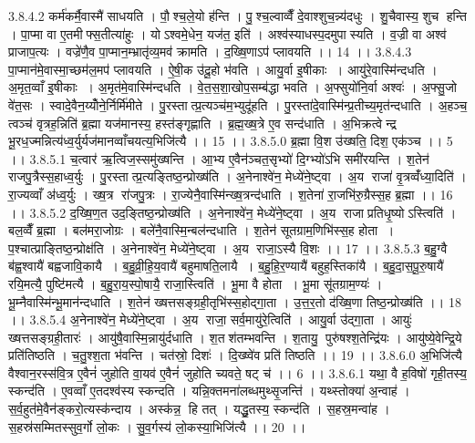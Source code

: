 3.8.4.2
कर्म॑कर्मै॒वास्मै॑ साधयति । पौ॒॒श्च॒ले॒यो ह॑न्ति । पु॒॒श्च॒ल्वाव्वैँ दे॒वाश्शुच॒न्न्य॑दधुः । शु॒चैवास्य॒ शुच॑ हन्ति । पा॒प्मा वा ए॒तमीफ्स॒तीत्या॑हुः । योऽश्वमे॒धेन॒ यज॑त॒ इति॑ । अश्व॑स्याधस्प॒दमुपास्यति । व॒ज्री वा अश्व॑ प्राजाप॒त्यः । वज्रे॑णै॒व पा॒प्मान॒म्भ्रातृ॑व्य॒मव॑ क्रामति । द॒ख्षि॒णाऽप॑ प्लावयति ।। 14 ।।
3.8.4.3
पा॒प्मान॑मे॒वास्मा॒च्छम॑ल॒मप॑ प्लावयति । ऐ॒षी॒क उ॑दू॒हो भ॑वति । आयु॒र्वा इ॒षीकाः । आयु॑रे॒वास्मि॑न्दधति । अ॒मृत॒व्वाँ इ॒षीकाः । अ॒मृत॑मे॒वास्मि॑न्दधति । वे॒त॒स॒शा॒खोप॒सम्ब॑द्धा भवति । अ॒फ्सुयो॑नि॒र्वा अश्वः॑ । अ॒फ्सु॒जो वे॑त॒सः । स्वादे॒वैन॒य्योँने॒र्निर्मि॑मीते । पु॒रस्तात्प्र॒त्यञ्च॑म॒भ्युदू॑हति । पु॒रस्ता॑दे॒वास्मि॑न्प्र॒तीच्य॒मृत॑न्दधाति । अ॒हञ्च॒ त्वञ्च॑ वृत्रह॒न्निति॑ ब्र॒ह्मा यज॑मानस्य॒ हस्त॑ङ्गृह्णाति । ब्र॒ह्म॒ख्ष॒त्रे ए॒व सन्द॑धाति । अ॒भिक्रत्वेन्द्र भू॒रध॒ज्मन्नित्य॑ध्व॒र्युर्यज॑मानव्वाँचयत्य॒भिजि॑त्यै ।। 15 ।।
3.8.5.0
ब्र॒ह्मा वि॒श उ॑ख्षति॒ दिश॒ एक॑ञ्च ।। 5 ।।
3.8.5.1
च॒त्वार॑ ऋ॒त्विज॒स्समु॑ख्षन्ति । आ॒भ्य ए॒वैन॑ञ्चत॒सृभ्यो॑ दि॒ग्भ्यो॑ऽभि समी॑रयन्ति । श॒तेन॑ राजपु॒त्रैस्स॒हाध्व॒र्युः । पु॒रस्तात्प्र॒त्यङ्तिष्ठ॒न्प्रोख्ष॑ति । अ॒नेनाश्वे॑न॒ मेध्ये॑ने॒ष्ट्वा । अ॒य राजा॑ वृ॒त्रव्वँ॑ध्या॒दिति॑ । रा॒ज्यव्वाँ अ॑ध्व॒र्युः । ख्ष॒त्र रा॑जपु॒त्रः । रा॒ज्येनै॒वास्मि॑न्ख्ष॒त्रन्द॑धाति । श॒तेना॑ रा॒जभि॑रु॒ग्रैस्स॒ह ब्र॒ह्मा ।। 16 ।।
3.8.5.2
द॒ख्षि॒ण॒त उद॒ङ्तिष्ठ॒न्प्रोख्ष॑ति । अ॒नेनाश्वे॑न॒ मेध्ये॑ने॒ष्ट्वा । अ॒य राजाप्रतिधृ॒ष्योऽस्त्विति॑ । बल॒व्वैँ ब्र॒ह्मा । बल॑मरा॒जोग्रः । बले॑नै॒वास्मि॒न्बल॑न्दधाति । श॒तेन॑ सूतग्राम॒णिभि॑स्स॒ह होता । प॒श्चात्प्राङ्तिष्ठ॒न्प्रोक्ष॑ति । अ॒नेनाश्वे॑न॒ मेध्ये॑ने॒ष्ट्वा । अ॒य राजा॒ऽस्यै वि॒शः ।। 17 ।।
3.8.5.3
ब॒हु॒ग्वै ब॑ह्व॒श्वायै॑ बह्वजावि॒कायै । ब॒हु॒व्री॒हि॒य॒वायै॑ बहुमाषति॒लायै । ब॒हु॒हि॒र॒ण्यायै॑ बहुह॒स्तिका॑यै । ब॒हु॒दा॒स॒पू॒रु॒षायै॑ रयि॒मत्यै॒ पुष्टि॑मत्यै । ब॒हु॒रा॒य॒स्पो॒षायै॒ राजा॒स्त्विति॑ । भू॒मा वै होता । भू॒मा सू॑तग्राम॒ण्यः॑ । भू॒म्नैवास्मि॑न्भू॒मान॑न्दधाति । श॒तेन॑ ख्षत्तसङ्ग्रही॒तृभि॑स्स॒होद्गा॒ता । उ॒त्त॒र॒तो द॑ख्षि॒णा तिष्ठ॒न्प्रोख्ष॑ति ।। 18 ।।
3.8.5.4
अ॒नेनाश्वे॑न॒ मेध्ये॑ने॒ष्ट्वा । अ॒य राजा॒ सर्व॒मायु॑रे॒त्विति॑ । आयु॒र्वा उ॑द्गा॒ता । आयुः॑ ख्षत्तसङ्ग्रही॒तारः॑ । आयु॑षै॒वास्मि॒न्नायु॑र्दधाति । श॒तश॑तम्भवन्ति । श॒तायु॒ पुरु॑षश्श॒तेन्द्रि॑यः । आयु॑ष्ये॒वेन्द्रि॒ये प्रति॑तिष्ठति । च॒तु॒श्श॒ता भ॑वन्ति । चत॑स्रो॒ दिशः॑ । दि॒ख्ष्वे॑व प्रति॑ तिष्ठति ।। 19 ।।
3.8.6.0
अ॒भिजि॑त्यै वैश्वान॒रस्स॑वि॒त्र ए॒वैनं॑ जुहोति वा॒यव॑ ए॒वैनं॑ जुहोति च्यवते॒ षट् च॑ ।। 6 ।।
3.8.6.1
यथा॒ वै ह॒विषो॑ गृही॒तस्य॒ स्कन्द॑ति । ए॒वव्वाँ ए॒तदश्व॑स्य स्कन्दति । यन्नि॒क्तमना॑लब्धमुथ्सृ॒जन्ति॑ । यथ्स्तोक्या॑ अ॒न्वाह॑ । स॒र्व॒हुत॑मे॒वैन॑ङ्करो॒त्यस्क॑न्दाय । अस्क॑न्न॒॒ हि तत् । यद्धु॒तस्य॒ स्कन्द॑ति । स॒हस्र॒मन्वा॑ह । स॒हस्र॑सम्मितस्सुव॒र्गो लो॒कः । सु॒व॒र्गस्य॑ लो॒कस्या॒भिजि॑त्यै ।। 20 ।।
